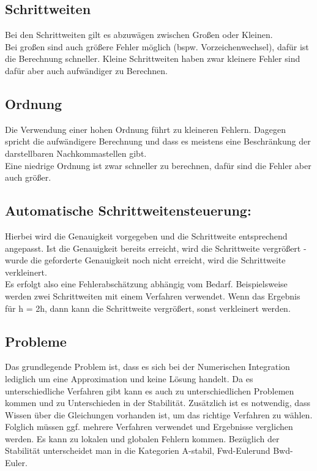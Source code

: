 \documentclass[11pt, fleqn, a4paper, leqno]{scrartcl} %
\begin{document}
		\subsection{Schrittweiten}
			Bei den Schrittweiten gilt es abzuwägen zwischen Großen oder Kleinen.\\
			Bei großen sind auch größere Fehler möglich (bspw. Vorzeichenwechsel), dafür ist die Berechnung schneller. Kleine Schrittweiten haben zwar kleinere Fehler sind dafür aber auch aufwändiger zu Berechnen.\\
		\subsection{Ordnung}
			Die Verwendung einer hohen Ordnung führt zu kleineren Fehlern. Dagegen spricht die aufwändigere Berechnung und dass es meistens eine Beschränkung der darstellbaren Nachkommastellen gibt.\\
			Eine niedrige Ordnung ist zwar schneller zu berechnen, dafür sind die Fehler aber auch größer.
		\subsection{Automatische Schrittweitensteuerung:}
			Hierbei wird die Genauigkeit vorgegeben und die Schrittweite entsprechend angepasst. Ist die Genauigkeit bereits erreicht, wird die Schrittweite vergrößert - wurde die geforderte Genauigkeit noch nicht erreicht, wird die Schrittweite verkleinert.\\
			Es erfolgt also eine Fehlerabschätzung abhängig vom Bedarf. Beispielsweise werden zwei Schrittweiten mit einem Verfahren verwendet. Wenn das Ergebnis für h = 2h, dann kann die Schrittweite vergrößert, sonst verkleinert werden.
		\subsection{Probleme}
			Das grundlegende Problem ist, dass es sich bei der Numerischen Integration lediglich um eine Approximation und keine Lösung handelt. Da es unterschiedliche Verfahren gibt kann es auch zu unterschiedlichen Problemen kommen und zu Unterschieden in der Stabilität. Zusätzlich ist es notwendig, dass Wissen über die Gleichungen vorhanden ist, um das richtige Verfahren zu wählen.\\
			Folglich müssen ggf. mehrere Verfahren verwendet und Ergebnisse verglichen werden. Es kann zu lokalen und globalen Fehlern kommen. Bezüglich der Stabilität unterscheidet man in die Kategorien \glqq A-stabil\grqq, \glqq Fwd-Euler\grqq und \glqq Bwd-Euler\grqq.
\end{document}
